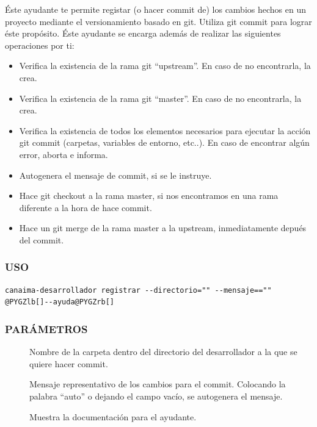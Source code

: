 \documentclass[letterpaper,12pt,spanish]{manual}
\begin{document}
Éste ayudante te permite registar (o hacer commit de) los cambios hechos en un proyecto mediante el versionamiento basado en git. Utiliza git commit para lograr éste propósito. Éste ayudante se encarga además de realizar las siguientes operaciones por ti:
\begin{itemize}
\item {} 
Verifica la existencia de la rama git ``upstream''. En caso de no encontrarla, la crea.

\item {} 
Verifica la existencia de la rama git ``master''. En caso de no encontrarla, la crea.

\item {} 
Verifica la existencia de todos los elementos necesarios para ejecutar la acción git commit (carpetas, variables de entorno, etc..). En caso de encontrar algún error, aborta e informa.

\item {} 
Autogenera el mensaje de commit, si se le instruye.

\item {} 
Hace git checkout a la rama master, si nos encontramos en una rama diferente a la hora de hace commit.

\item {} 
Hace un git merge de la rama master a la upstream, inmediatamente depués del commit.

\end{itemize}


\subsubsection{USO}

\begin{Verbatim}[commandchars=@\[\]]
canaima-desarrollador registrar --directorio="" --mensaje=="" @PYGZlb[]--ayuda@PYGZrb[]
\end{Verbatim}


\subsubsection{PARÁMETROS}
\begin{description}
\item[{}] \leavevmode
Nombre de la carpeta dentro del directorio del desarrollador a la que se quiere hacer commit.

\item[{}] \leavevmode
Mensaje representativo de los cambios para el commit. Colocando la palabra ``auto'' o dejando el campo vacío, se autogenera el mensaje.

\item[{}] \leavevmode
Muestra la documentación para el ayudante.

\end{description}
\end{document}

